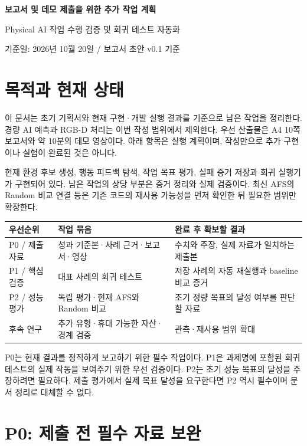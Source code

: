 \documentclass[a4paper,11pt]{article}
\begin{document}
\begin{center}
{\LARGE\bfseries 보고서 및 데모 제출을 위한 추가 작업 계획\par}
\vspace{6pt}
{\large Physical AI 작업 수행 검증 및 회귀 테스트 자동화\par}
\vspace{4pt}
{\small 기준일: 2026년 10월 20일 / 보고서 초안 v0.1 기준}
\end{center}

\section{목적과 현재 상태}
이 문서는 초기 기획서와 현재 구현·개발 실행 결과를 기준으로 남은 작업을 정리한다.
경량 AI 예측과 RGB-D 처리는 이번 작성 범위에서 제외한다. 우선 산출물은
A4 10쪽 보고서와 약 10분의 데모 영상이다. 아래 항목은 실행 계획이며, 작성만으로
추가 구현이나 실험이 완료된 것은 아니다.

현재 환경 후보 생성, 행동 피드백 탐색, 작업 목표 평가, 실패 증거 저장과 회귀
실행기가 구현되어 있다. 남은 작업의 상당 부분은 증거 정리와 실제 검증이다.
최신 AFS의 Random 비교 연결 등은 기존 코드의 재사용 가능성을 먼저 확인한 뒤
필요한 범위만 확장한다.

{\small
\begin{tabularx}{\linewidth}{@{}p{26mm}YY@{}}
\toprule
우선순위 & 작업 묶음 & 완료 후 확보할 결과 \\
\midrule
P0 / 제출 자료 & 성과 기준본·사례 근거·보고서·영상 & 수치와 주장, 실제 자료가 일치하는 제출본 \\
P1 / 핵심 검증 & 대표 사례의 회귀 테스트 & 저장 사례의 자동 재실행과 baseline 비교 증거 \\
P2 / 성능 평가 & 독립 평가·현재 AFS와 Random 비교 & 초기 정량 목표의 달성 여부를 판단할 자료 \\
후속 연구 & 추가 유형·휴대 가능한 자산·경계 검증 & 관측·재사용 범위 확대 \\
\bottomrule
\end{tabularx}}

P0는 현재 결과를 정직하게 보고하기 위한 필수 작업이다. P1은 과제명에 포함된
회귀 테스트의 실제 작동을 보여주기 위한 우선 검증이다. P2는 초기 성능 목표의
달성을 주장하려면 필요하다. 제출 평가에서 실제 목표 달성을 요구한다면 P2 역시
필수이며 문서 정리로 대체할 수 없다.

\section{P0: 제출 전 필수 자료 보완}
\end{document}
